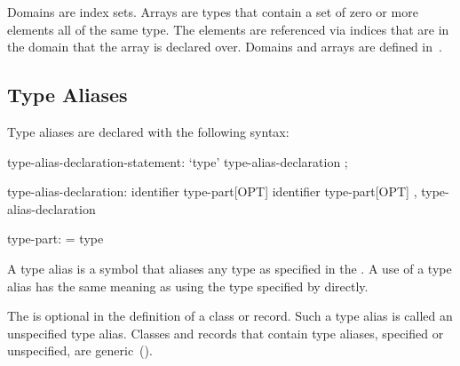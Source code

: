 Domains are index sets.  Arrays are types that contain a set of zero
or more elements all of the same type.  The elements are referenced
via indices that are in the domain that the array is declared over.
Domains and arrays are defined in~.

\subsection{Type Aliases}
\label{Type_Aliases}

Type aliases are declared with the following syntax:
\begin{syntax}
type-alias-declaration-statement:
  `type' type-alias-declaration ;

type-alias-declaration:
  identifier type-part[OPT]
  identifier type-part[OPT] , type-alias-declaration

type-part:
  = type
\end{syntax}
A type alias is a symbol that aliases any type as specified in the
.  A use of a type alias has the same meaning as using
the type specified by  directly.

The  is optional in the definition of a class or
record.  Such a type alias is called an unspecified type
alias. Classes and records that contain type aliases, specified or
unspecified, are generic~().

